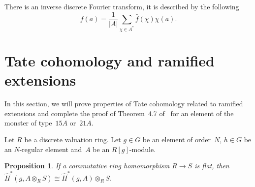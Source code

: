 \documentclass[11pt]{article}
\numberwithin{equation}{section}
\numberwithin{equation}{section}
\newtheorem{Proposition}[Theorem]{Proposition}
 { \theoremstyle{definition}
\newtheorem{Definition}[Theorem]{Definition}
\newtheorem{Note}[Theorem]{Note}
\newtheorem{Example}[Theorem]{Example}
\newtheorem{Remark}[Theorem]{Remark} }
\begin{document}
There is an inverse discrete Fourier transform, it is described by the following
\[
f(a)=\frac{1}{|A|}\sum_{\chi \in A^*}\hat{f}(\chi)\overline{\chi}(a).
\]

\setcounter{section}{3}
\section{Tate cohomology and ramified extensions}\label{section4}

In this section, we will prove properties of Tate cohomology related to ramified extensions and complete the proof of Theorem~4.7 of~\cite{BR} for an element of the monster of type~$15A $ or~$21A$.

Let $R$ be a discrete valuation ring. Let $g \in G$ be an element of order~$N$, $h \in G$ be an $N$-regular element and~$A$ be an $R[g]$-module.

\begin{Proposition}\label{tensor}
If a commutative ring homomorphism $R \rightarrow S$ is flat, then $\hat{H}^*(g,A\otimes_{R}S)\cong \hat{H}^*(g,A)\otimes_{R}S$.
\end{Proposition}
\end{document}
